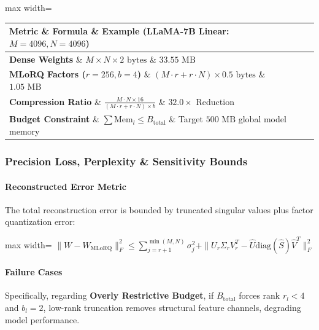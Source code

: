\begin{center}
\begin{adjustbox}{max width=\columnwidth}
\renewcommand{\arraystretch}{1.2}
\begin{tabular}{lll}
\toprule
Metric \& Formula \& Example (LLaMA-7B Linear: $M=4096, N=4096$) \\
\midrule
\textbf{Dense Weights} \& $M \times N \times 2 \text{ bytes}$ \& $33.55 \text{ MB}$ \\
\textbf{MLoRQ Factors ($r=256, b=4$)} \& $(M \cdot r + r \cdot N) \times 0.5 \text{ bytes}$ \& $1.05 \text{ MB}$ \\
\textbf{Compression Ratio} \& $\frac{M \cdot N \times 16}{(M \cdot r + r \cdot N) \times b}$ \& $\mathbf{32.0\times}$ Reduction \\
\textbf{Budget Constraint} \& $\sum \text{Mem}_l \le B_{\text{total}}$ \& Target $500 \text{ MB}$ global model memory \\

\bottomrule
\end{tabular}
\end{adjustbox}
\end{center}

\subsubsection*{Precision Loss, Perplexity \& Sensitivity Bounds}

\paragraph{Reconstructed Error Metric}

The total reconstruction error is bounded by truncated singular values plus factor quantization error:

\begin{center}
\begin{adjustbox}{max width=\columnwidth}
$\displaystyle
\| W - W_{\text{MLoRQ}} \|_F^2 \le \sum_{j=r+1}^{\min(M, N)} \sigma_j^2 + \| U_r \Sigma_r V_r^T - \widehat{U} \text{diag}(\widehat{S}) \widehat{V}^T \|_F^2
$
\end{adjustbox}
\end{center}

\paragraph{Failure Cases}

Specifically, regarding \textbf{Overly Restrictive Budget}, if $B_{\text{total}}$ forces rank $r_l < 4$ and $b_l = 2$, low-rank truncation removes structural feature channels, degrading model performance.



